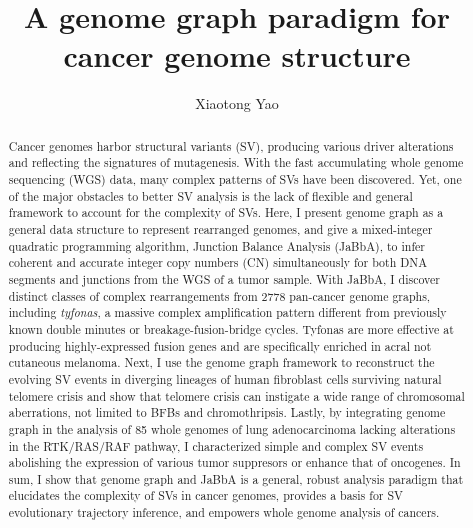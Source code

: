 \documentclass[phd,tocprelim]{cornell}
\title{A genome graph paradigm for cancer genome structure}
\author {Xiaotong Yao}
\begin{document}
\maketitle
\makecopyright

\begin{abstract}
    Cancer genomes harbor structural variants (SV), producing various driver alterations and reflecting the signatures of mutagenesis. With the fast accumulating whole genome sequencing (WGS) data, many complex patterns of SVs have been discovered. Yet, one of the major obstacles to better SV analysis is the lack of flexible and general framework to account for the complexity of SVs. Here, I present genome graph as a general data structure to represent rearranged genomes, and give a mixed-integer quadratic programming algorithm, Junction Balance Analysis (JaBbA), to infer coherent and accurate integer copy numbers (CN) simultaneously for both DNA segments and junctions from the WGS of a tumor sample. With JaBbA, I discover distinct classes of complex rearrangements from 2778 pan-cancer genome graphs, including \textit{tyfonas}, a massive complex amplification pattern different from previously known double minutes or breakage-fusion-bridge cycles. Tyfonas are more effective at producing highly-expressed fusion genes and are specifically enriched in acral not cutaneous melanoma. Next, I use the genome graph framework to reconstruct the evolving SV events in diverging lineages of human fibroblast cells surviving natural telomere crisis and show that telomere crisis can instigate a wide range of chromosomal aberrations, not limited to BFBs and chromothripsis. Lastly, by integrating genome graph in the analysis of 85 whole genomes of lung adenocarcinoma lacking alterations in the RTK/RAS/RAF pathway, I characterized simple and complex SV events abolishing the expression of various tumor suppresors or enhance that of oncogenes. In sum, I show that genome graph and JaBbA is a general, robust analysis paradigm that elucidates the complexity of SVs in cancer genomes, provides a basis for SV evolutionary trajectory inference, and empowers whole genome analysis of cancers.

\end{abstract}
\end{document}
